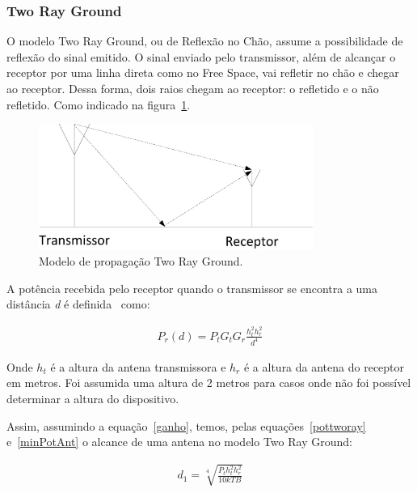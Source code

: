 \subsubsection{Two Ray Ground}

O modelo Two Ray Ground, ou de Reflexão no Chão, assume a possibilidade de reflexão do sinal emitido. O sinal enviado pelo transmissor, além de alcançar o receptor por uma linha direta como no Free Space, vai refletir no chão e chegar ao receptor. Dessa forma, dois raios chegam ao receptor: o refletido e o não refletido. Como indicado na figura~\ref{fig:tworay}.

\begin{figure}[htb]
\centering
\includegraphics[width=0.8\textwidth]{figs/tworay}
\caption[Modelo de propagação Two Ray Ground.]
{Modelo de propagação Two Ray Ground.}
\label{fig:tworay}
\end{figure}


A potência recebida pelo receptor quando o transmissor se encontra a uma distância \textit{d} é definida~\cite{rapapport} como: 

\begin{align}
  \label{pottworay} P_r(d) = P_tG_tG_r\frac{h_t^{2}h_r^{2}}{d^4}
\end{align}

Onde \begin{math}h_t\end{math} é a altura da antena transmissora e \begin{math}h_r\end{math} é a altura da antena do receptor em metros. Foi assumida uma altura de 2 metros para casos onde não foi possível determinar a altura do dispositivo.

Assim, assumindo a equação~\ref{ganho}, temos, pelas equações~\ref{pottworay} e~\ref{minPotAnt} o alcance de uma antena no modelo Two Ray Ground:

\begin{align}
  \label{dTwoRayAnt} d_1 = \sqrt[4]{\frac{P_th_t^{2}h_r^{2}}{10kTB}}
\end{align}

